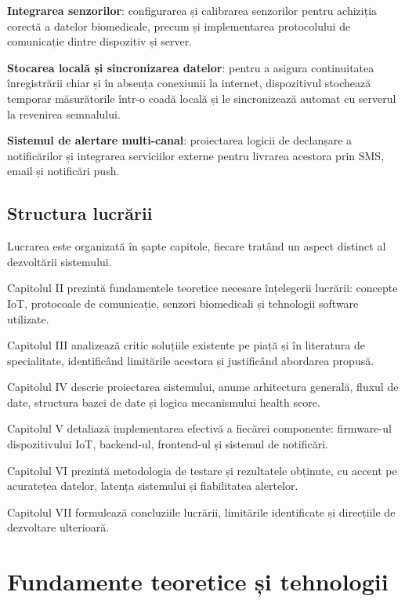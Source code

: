 \documentclass[12pt,a4paper]{article}
\begin{document}
\textbf{Integrarea senzorilor}: configurarea și calibrarea senzorilor pentru achiziția corectă a datelor biomedicale, precum și implementarea protocolului de comunicație dintre dispozitiv și server.

\textbf{Stocarea locală și sincronizarea datelor}: pentru a asigura continuitatea înregistrării chiar și în absența conexiunii la internet, dispozitivul stochează temporar măsurătorile într-o coadă locală și le sincronizează automat cu serverul la revenirea semnalului.

\textbf{Sistemul de alertare multi-canal}: proiectarea logicii de declanșare a notificărilor și integrarea serviciilor externe pentru livrarea acestora prin SMS, email și notificări push.

\subsection{Structura lucrării}

Lucrarea este organizată în șapte capitole, fiecare tratând un aspect distinct al dezvoltării sistemului.

Capitolul II prezintă fundamentele teoretice necesare înțelegerii lucrării: concepte IoT, protocoale de comunicație, senzori biomedicali și tehnologii software utilizate.

Capitolul III analizează critic soluțiile existente pe piață și în literatura de specialitate, identificând limitările acestora și justificând abordarea propusă.

Capitolul IV descrie proiectarea sistemului, anume arhitectura generală, fluxul de date, structura bazei de date și logica mecanismului health score.

Capitolul V detaliază implementarea efectivă a fiecărei componente: firmware-ul dispozitivului IoT, backend-ul, frontend-ul și sistemul de notificări.

Capitolul VI prezintă metodologia de testare și rezultatele obținute, cu accent pe acuratețea datelor, latența sistemului și fiabilitatea alertelor.

Capitolul VII formulează concluziile lucrării, limitările identificate și direcțiile de dezvoltare ulterioară.

\newpage
\section{Fundamente teoretice și tehnologii}
\end{document}
